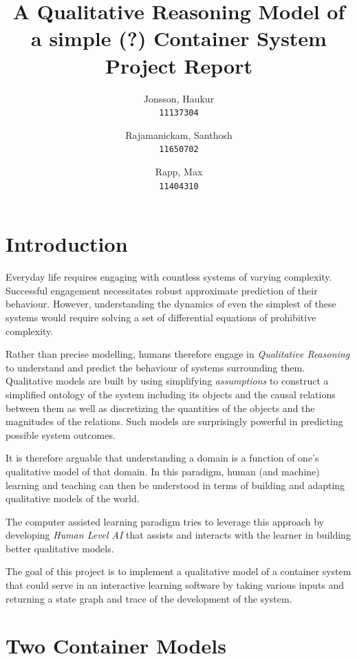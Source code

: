 \documentclass{article}
\begin{document}
\author{
  Jonsson, Haukur\\
  \texttt{11137304}
  \and
  Rajamanickam, Santhosh\\
  \texttt{11650702}
  \and
  Rapp, Max\\
  \texttt{11404310}
}
\title{A Qualitative Reasoning Model of a simple (?) Container System\\
	\large Project Report}
\maketitle



\section{Introduction}

Everyday life requires engaging with countless systems of varying complexity. Successful engagement necessitates robust approximate prediction of their behaviour. However, understanding the dynamics of even the simplest of these systems would require solving a set of differential equations of prohibitive complexity.

Rather than precise modelling, humans therefore engage in \textit{Qualitative Reasoning} to understand and predict the behaviour of systems surrounding them. Qualitative models are built by using simplifying \textit{assumptions} to construct a simplified ontology of the system including its objects and the causal relations between them as well as discretizing the quantities of the objects and the magnitudes of the relations. Such models are surprisingly powerful in predicting possible system outcomes.

It is therefore arguable that understanding a domain is a function of one's qualitative model of that domain. In this paradigm, human (and machine) learning and teaching can then be understood in terms of building and adapting qualitative models of the world. 

The computer assisted learning paradigm tries to leverage this approach by developing \textit{Human Level AI} that assists and interacts with the learner in building better qualitative models.

The goal of this project is to implement a qualitative model of a container system that could serve in an interactive learning software by taking various inputs and returning a state graph and trace of the development of the system.

\section{Two Container Models}
\end{document}
